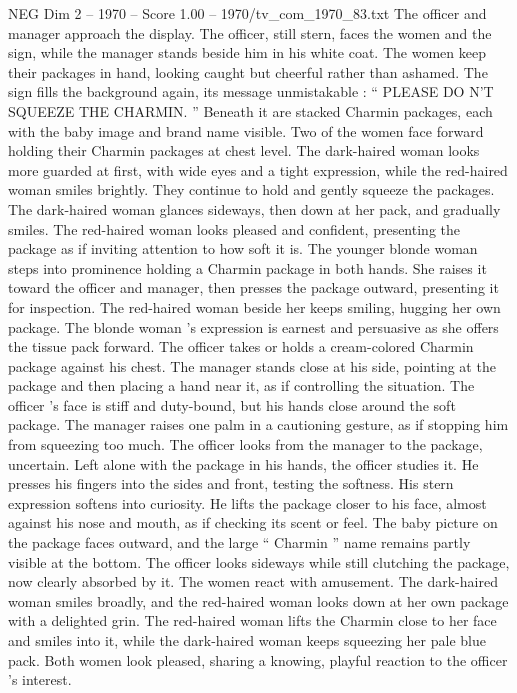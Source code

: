 \begin{textsample}{NEG Dim 2 – 1970 – Score 1.00 – 1970/tv\_com\_1970\_83.txt}
The officer and manager approach the display.
The officer, still stern, faces the women and the sign, while the manager stands beside him in his white coat.
The women keep their packages in hand, looking caught but cheerful rather than ashamed.
The sign fills the background again, its message unmistakable : “ PLEASE DO N’T SQUEEZE THE CHARMIN. ” Beneath it are stacked Charmin packages, each with the baby image and brand name visible.
Two of the women face forward holding their Charmin packages at chest level.
The dark-haired woman looks more guarded at first, with wide eyes and a tight expression, while the red-haired woman smiles brightly.
They continue to hold and gently squeeze the packages.
The dark-haired woman glances sideways, then down at her pack, and gradually smiles.
The red-haired woman looks pleased and confident, presenting the package as if inviting attention to how soft it is.
The younger blonde woman steps into prominence holding a Charmin package in both hands.
She raises it toward the officer and manager, then presses the package outward, presenting it for inspection.
The red-haired woman beside her keeps smiling, hugging her own package.
The blonde woman ’s expression is earnest and persuasive as she offers the tissue pack forward.
The officer takes or holds a cream-colored Charmin package against his chest.
The manager stands close at his side, pointing at the package and then placing a hand near it, as if controlling the situation.
The officer ’s face is stiff and duty-bound, but his hands close around the soft package.
The manager raises one palm in a cautioning gesture, as if stopping him from squeezing too much.
The officer looks from the manager to the package, uncertain.
Left alone with the package in his hands, the officer studies it.
He presses his fingers into the sides and front, testing the softness.
His stern expression softens into curiosity.
He lifts the package closer to his face, almost against his nose and mouth, as if checking its scent or feel.
The baby picture on the package faces outward, and the large “ Charmin ” name remains partly visible at the bottom.
The officer looks sideways while still clutching the package, now clearly absorbed by it.
The women react with amusement.
The dark-haired woman smiles broadly, and the red-haired woman looks down at her own package with a delighted grin.
The red-haired woman lifts the Charmin close to her face and smiles into it, while the dark-haired woman keeps squeezing her pale blue pack.
Both women look pleased, sharing a knowing, playful reaction to the officer ’s interest.

\end{textsample}
